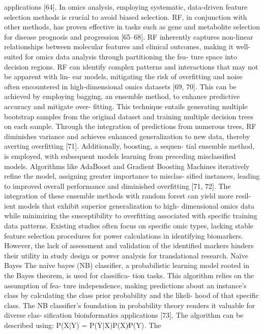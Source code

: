 applications [64]. In omics analysis, employing systematic,
data-driven feature selection methods is crucial to avoid
biased selection. RF, in conjunction with other methods,
has proven effective in tasks such as gene and metabolite
selection for disease prognosis and progression [65–68].
RF inherently captures non-linear relationships between
molecular features and clinical outcomes, making it well-
suited for omics data analysis through partitioning the fea-
ture space into decision regions. RF can identify complex
patterns and interactions that may not be apparent with lin-
ear models, mitigating the risk of overfitting and noise often
encountered in high-dimensional omics datasets [69, 70].
This can be achieved by employing bagging, an ensemble
method, to enhance predictive accuracy and mitigate over-
fitting. This technique entails generating multiple bootstrap
samples from the original dataset and training multiple
decision trees on each sample. Through the integration of
predictions from numerous trees, RF diminishes variance
and achieves enhanced generalization to new data, thereby
averting overfitting [71]. Additionally, boosting, a sequen-
tial ensemble method, is employed, with subsequent models
learning from preceding misclassified models. Algorithms
like AdaBoost and Gradient Boosting Machines iteratively
refine the model, assigning greater importance to misclas-
sified instances, leading to improved overall performance
and diminished overfitting [71, 72]. The integration of these
ensemble methods with random forest can yield more resil-
ient models that exhibit superior generalization to high-
dimensional omics data while minimizing the susceptibility
to overfitting associated with specific training data patterns.
Existing studies often focus on specific omic types, lacking
stable feature selection procedures for power calculations
in identifying biomarkers. However, the lack of assessment
and validation of the identified markers hinders their utility
in study design or power analysis for translational research.
Naïve Bayes
The naïve bayes (NB) classifier, a probabilistic learning
model rooted in the Bayes theorem, is used for classifica-
tion tasks. This algorithm relies on the assumption of fea-
ture independence, making predictions about an instance’s
class by calculating the class prior probability and the likeli-
hood of that specific class. The NB classifier’s foundation
in probability theory renders it valuable for diverse clas-
sification bioinformatics applications [73]. The algorithm
can be described using: P(X|Y) = P(Y|X)P(X)∕P(Y) . The
